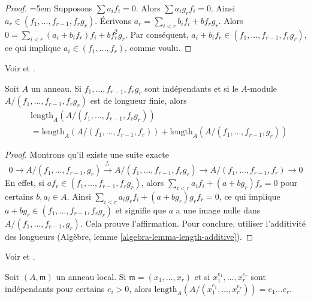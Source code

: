 \begin{proof}
{\emergencystretch=5em
Supposons $\sum a_if_i = 0$. Alors $\sum a_ig_rf_i = 0$. Ainsi $a_r \in (f_1, \ldots, f_{r - 1}, f_rg_r)$. Écrivons $a_r = \sum_{i < r} b_i f_i + b f_rg_r$. Alors $0 = \sum_{i < r} (a_i + b_if_r)f_i + bf_r^2g_r$. Par conséquent, $a_i + b_i f_r \in (f_1, \ldots, f_{r - 1}, f_rg_r)$, ce qui implique $a_i \in (f_1, \ldots, f_r)$, comme voulu.
\par}
\end{proof}

\begin{lemma}
\label{lemma-2}
\begin{reference}
Voir \cite{Lech-inequalities} et \cite[Lemma 2 page 300]{MatCA}.
\end{reference}
Soit $A$ un anneau. Si $f_1, \ldots, f_{r - 1}, f_rg_r$ sont indépendants et si le $A$-module $A/(f_1, \ldots, f_{r - 1}, f_rg_r)$ est de longueur finie, alors
\begin{align*}
& \text{length}_A(A/(f_1, \ldots, f_{r - 1}, f_rg_r)) \\
& =
\text{length}_A(A/(f_1, \ldots, f_{r - 1}, f_r)) +
\text{length}_A(A/(f_1, \ldots, f_{r - 1}, g_r))
\end{align*}
\end{lemma}

\begin{proof}
Montrons qu'il existe une suite exacte
$$
0 \to
A/(f_1, \ldots, f_{r - 1}, g_r) \xrightarrow{f_r}
A/(f_1, \ldots, f_{r - 1}, f_rg_r) \to
A/(f_1, \ldots, f_{r - 1}, f_r) \to 0
$$
En effet, si $a f_r \in (f_1, \ldots, f_{r - 1}, f_rg_r)$, alors $\sum_{i < r} a_i f_i + (a + bg_r)f_r = 0$ pour certains $b, a_i \in A$. Ainsi $\sum_{i < r} a_i g_r f_i + (a + bg_r)g_rf_r = 0$, ce qui implique $a + bg_r \in (f_1, \ldots, f_{r - 1}, f_rg_r)$ et signifie que $a$ a une image nulle dans $A/(f_1, \ldots, f_{r - 1}, g_r)$. Cela prouve l'affirmation. Pour conclure, utiliser l'additivité des longueurs (Algèbre, lemme \ref{algebra-lemma-length-additive}).
\end{proof}

\begin{lemma}
\label{lemma-3}
\begin{reference}
Voir \cite{Lech-inequalities} et \cite[Lemma 3 page 300]{MatCA}.
\end{reference}
Soit $(A, \mathfrak m)$ un anneau local. Si $\mathfrak m = (x_1, \ldots, x_r)$ et si $x_1^{e_1}, \ldots, x_r^{e_r}$ sont indépendants pour certains $e_i > 0$, alors $\text{length}_A(A/(x_1^{e_1}, \ldots, x_r^{e_r})) = e_1\ldots e_r$.
\end{lemma}

